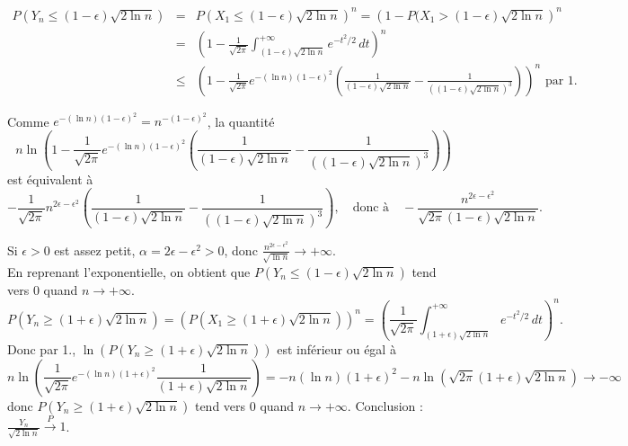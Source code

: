 {\begin{enumerate}
{\begin{eqnarray*}
P(Y_n\leq (1-\epsilon)\sqrt{2\ln n})&=&P(X_1\leq (1-\epsilon)\sqrt{2\ln n})^n
=\left(1-P(X_1>(1-\epsilon)\sqrt{2\ln n}\right)^n\\
&=&\left(1-\frac{1}{\sqrt{2\pi}}\int_{(1-\epsilon)\sqrt{2\ln n}}^{+\infty}
e^{-t^2/2}\,dt\right)^n\\
&\leq & \left(1-\frac{1}{\sqrt{2\pi}}e^{-(\ln n)(1-\epsilon)^2}
\left(\frac{1}{(1-\epsilon)\sqrt{2\ln n}}-\frac{1}{((1-\epsilon)\sqrt{2\ln n})^3}
\right)\right)^n\mbox{ par 1.}
\end{eqnarray*}

Comme $e^{-(\ln n)(1-\epsilon)^2}=n^{-(1-\epsilon)^2}$, la quantité
$$
n\ln\left(1-\frac{1}{\sqrt{2\pi}}e^{-(\ln n)(1-\epsilon)^2}
\left(\frac{1}{(1-\epsilon)\sqrt{2\ln n}}-\frac{1}{((1-\epsilon)\sqrt{2\ln n})^3}
\right)\right)$$ est équivalent à
$$-\frac{1}{\sqrt{2\pi}} n^{2\epsilon-\epsilon^2}
\left(\frac{1}{(1-\epsilon)\sqrt{2\ln n}}-\frac{1}{((1-\epsilon)\sqrt{2\ln n})^3}
\right),\quad \mbox{donc à}\quad \displaystyle -\frac{n^{2\epsilon-\epsilon^2}}{\sqrt{2\pi}(1-\epsilon)
\sqrt{2\ln n}} .$$

Si $\epsilon>0$ est assez petit, $\alpha=2\epsilon-\epsilon^2>0$, donc
$\displaystyle \frac{n^{2\epsilon-\epsilon^2}}{\sqrt{\ln n}}\to +\infty$. \\
En reprenant l'exponentielle, on obtient que
$P(Y_n\leq (1-\epsilon)\sqrt{2\ln n})$ tend vers $0$ quand $n\to +\infty$.
$$
P(Y_n\geq (1+\epsilon)\sqrt{2\ln n})=(P(X_1\geq (1+\epsilon)\sqrt{2\ln n}))^n
=\left(\frac{1}{\sqrt{2\pi}}\int_{(1+\epsilon)\sqrt{2\ln n}}^{+\infty}
e^{-t^2/2}\,dt\right)^n.$$ 
Donc par 1., 
$\displaystyle\ln (P(Y_n\geq (1+\epsilon)\sqrt{2\ln n}))$ est inférieur ou égal à
$$
n\ln\left(\frac{1}{\sqrt{2\pi}}e^{-(\ln n)(1+\epsilon)^2}\frac{1}{(1+\epsilon)
\sqrt{2\ln n}}\right)=-n (\ln n)(1+\epsilon)^2-n\ln(\sqrt{2\pi}(1+\epsilon)\sqrt{2\ln n})
\to -\infty$$
donc $\displaystyle P(Y_n\geq (1+\epsilon)\sqrt{2\ln n})$
tend vers $0$ quand $n\to +\infty$. Conclusion :
$\displaystyle\frac{Y_n}{\sqrt{2\ln n}}\stackrel{P}{\longrightarrow}1$.}
\end{enumerate}
}
